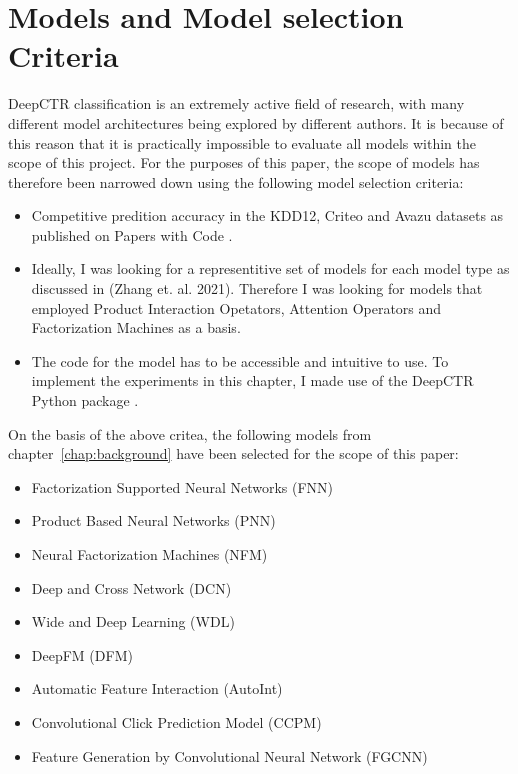 \documentclass{mldsmsc}
\begin{document}
\section{Models and Model selection Criteria}
\label{sec:model-selection}

DeepCTR classification is an extremely active field of research, with many
different model architectures being explored by different authors. It is because of this
reason that it is practically impossible to evaluate all models within the scope
of this project. For the purposes of this paper, the scope of models has therefore
been narrowed down using the following model selection criteria:

\begin{itemize}
\item Competitive predition accuracy in the KDD12, Criteo and Avazu datasets as published on Papers with Code \citep{RefWorks:2024papers}.
\item Ideally, I was looking for a representitive set of models for each model type as discussed in (Zhang et. al. 2021). Therefore I was looking for models that employed Product Interaction Opetators, Attention Operators and Factorization Machines as a basis.
\item The code for the model has to be accessible and intuitive to use. To implement the experiments
in this chapter, I made use of the DeepCTR Python package \citep{RefWorks:shen2017deepctr:}.
\end{itemize}

On the basis of the above critea, the following models from chapter~\ref{chap:background} have been selected for the scope of this paper:

\begin{itemize}
\item Factorization Supported Neural Networks (FNN) \citep{RefWorks:zhang2016deep}
\item Product Based Neural Networks (PNN) \citep{RefWorks:qu2016product-based}
\item Neural Factorization Machines (NFM) \citep{RefWorks:he2017neural}
\item Deep and Cross Network (DCN) \citep{RefWorks:wang2017deep}
\item Wide and Deep Learning (WDL) \citep{RefWorks:cheng2016wide}
\item DeepFM (DFM) \citep{RefWorks:guo2017deepfm:}
\item Automatic Feature Interaction (AutoInt) \citep{RefWorks:song2019autoint}
\item Convolutional Click Prediction Model (CCPM) \citep{RefWorks:liu2015convolutional}
\item Feature Generation by Convolutional Neural Network (FGCNN) \citep{RefWorks:liu2019feature}
\end{itemize}
\end{document}

